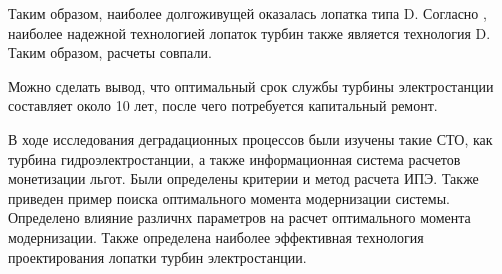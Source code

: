 Таким образом, наиболее долгоживущей оказалась лопатка типа D. 
Согласно \cite{Degradation}, наиболее надежной технологией лопаток турбин также является технология D.
Таким образом, расчеты совпали.

Можно сделать вывод, что оптимальный срок службы турбины электростанции составляет около 10 лет, после чего потребуется капитальный ремонт.

В ходе исследования деградационных процессов были изучены такие СТО, как турбина гидроэлектростанции,
а также информационная система расчетов монетизации льгот.
Были определены критерии и метод расчета ИПЭ. 
Также приведен пример поиска оптимального момента модернизации системы.
Определено влияние различнх параметров на расчет оптимального момента модернизации.
Также определена наиболее эффективная технология проектирования лопатки турбин электростанции.





